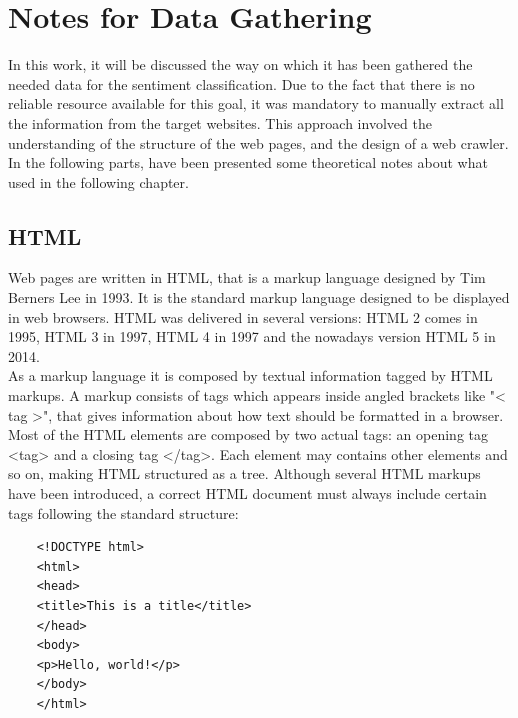 \section{Notes for Data Gathering}

In this work, it will be discussed the way on which it has been gathered the needed data for the sentiment classification. Due to the fact that there is no reliable resource available for this goal, it was mandatory to manually extract all the information from the target websites. This approach involved the understanding of the structure of the web pages, and the design of a web crawler. In the following parts, have been presented some theoretical notes about what used in the following chapter. 


\subsection{HTML}

Web pages are written in \ac{HTML}, that is a markup language designed by Tim Berners Lee in 1993. It is the standard markup language designed to be displayed in web browsers. HTML was delivered in several versions: \ac{HTML} 2 comes in 1995, \ac{HTML} 3 in 1997, \ac{HTML} 4 in 1997 and the nowadays version HTML 5 in 2014. \\
As a markup language it is composed by textual information tagged by \ac{HTML} markups. A markup consists of tags which appears inside angled brackets  like "< tag >", that gives information about how text should be formatted in a browser.	Most of the \ac{HTML} elements are composed by two actual tags: an opening tag <tag> and a closing tag </tag>. Each element may contains other elements and so on, making \ac{HTML} structured as a tree. Although several HTML markups have been introduced, a correct HTML document must always include certain tags following the standard structure:

\begin{center}
	\begin{lstlisting}
	<!DOCTYPE html>
	<html>
	<head>
	<title>This is a title</title>
	</head>
	<body>
	<p>Hello, world!</p>
	</body>
	</html>
	\end{lstlisting}
\end{center}

